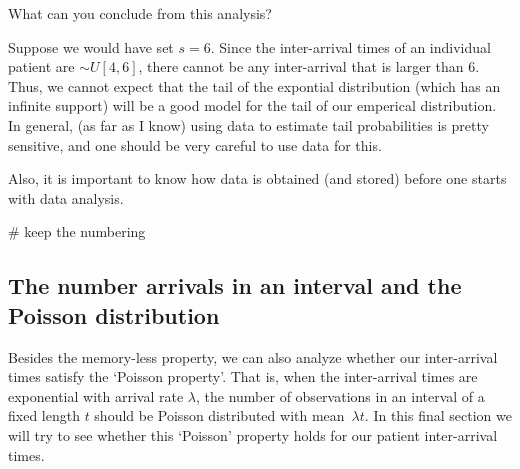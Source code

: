 \begin{exercise}
What can you conclude from this analysis?
  \begin{solution}
    Suppose we would have set $s=6$.
    Since the inter-arrival times of an individual patient are $\sim U[4, 6]$, there cannot be any inter-arrival that is larger than $6$.
    Thus, we cannot expect that the tail of the expontial distribution (which has an infinite support) will be a good model for the tail of our emperical distribution.
    In general, (as far as I know) using data to estimate tail probabilities is pretty sensitive, and one should be very careful to use data for this.

    Also, it is important to know how data is obtained (and stored) before one starts with data analysis.

\begin{pyverbatim}
# keep the numbering
\end{pyverbatim}
  \end{solution}
\end{exercise}


\subsection{The number arrivals in an interval and the Poisson distribution}

Besides the memory-less property, we can also analyze whether our inter-arrival times satisfy the `Poisson property'.
That is, when the inter-arrival times are exponential with arrival rate $\lambda$, the number of observations in an interval of a fixed length $t$ should be Poisson distributed with mean~$\lambda t$.  In this final section we will try to see whether this `Poisson' property holds for our patient inter-arrival times.

